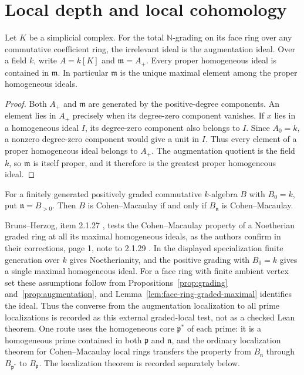 \section{Local depth and local cohomology}

\begin{lemma}\label{lem:face-ring-graded-maximal}
Let $K$ be a simplicial complex. For the total $\mathbb N$-grading on its
face ring over any commutative coefficient ring, the irrelevant ideal is
the augmentation ideal. Over a field $k$, write $A=k[K]$ and
$\mathfrak m=A_+$. Every proper homogeneous ideal is contained in
$\mathfrak m$. In particular $\mathfrak m$ is the unique
maximal element among the proper homogeneous ideals.
\leanok
\end{lemma}
\begin{proof}
\leanok
Both $A_+$ and $\mathfrak m$ are generated by the positive-degree
components. An element lies in $A_+$ precisely when its degree-zero
component vanishes. If $x$ lies in a homogeneous ideal $I$, its
degree-zero component also belongs to $I$. Since $A_0=k$, a nonzero
degree-zero component would give a unit in $I$. Thus every element
of a proper homogeneous ideal belongs to $A_+$. The augmentation
quotient is the field $k$, so $\mathfrak m$ is itself proper, and it
therefore is the greatest proper homogeneous ideal.
\end{proof}

\begin{theorem}\label{found:graded-cm}
For a finitely generated positively graded commutative $k$-algebra $B$ with
$B_0=k$, put $\mathfrak n=B_{>0}$. Then $B$ is Cohen--Macaulay if and only
if $B_{\mathfrak n}$ is Cohen--Macaulay.
\end{theorem}
Bruns--Herzog, item 2.1.27 \cite{bh}, tests the Cohen--Macaulay property
of a Noetherian graded ring at all its maximal homogeneous ideals, as the
authors confirm in their corrections, page 1, note to 2.1.29
\cite{bh-errata}. In the displayed specialization finite generation over
$k$ gives Noetherianity, and the positive grading with $B_0=k$ gives
a single maximal homogeneous ideal. For a face ring with finite ambient
vertex set these assumptions follow from Propositions~\ref{prop:grading}
and~\ref{prop:augmentation}, and Lemma~\ref{lem:face-ring-graded-maximal}
identifies the ideal. Thus the converse from the augmentation localization
to all prime localizations is recorded as this external graded-local test,
not as a checked Lean theorem. One route uses the homogeneous core
$\mathfrak p^*$ of each prime: it is a homogeneous prime contained in both
$\mathfrak p$ and $\mathfrak n$, and the ordinary localization theorem for
Cohen--Macaulay local rings transfers the property from $B_{\mathfrak n}$
through $B_{\mathfrak p^*}$ to $B_{\mathfrak p}$. The localization theorem
is recorded separately below.

